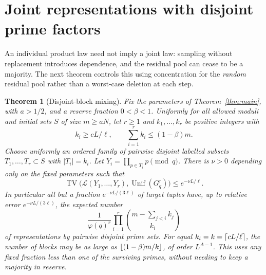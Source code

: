 \documentclass[11pt]{article}
\newtheorem{theorem}{Theorem}[section]
\theoremstyle{remark}\newtheorem{remark}[theorem]{Remark}
\newcommand{\TV}{\operatorname{TV}}\newcommand{\abs}[1]{\lvert#1\rvert}
\begin{document}
\section{Joint representations with disjoint prime factors}
\label{sec:joint}
An individual product law need not imply a joint law: sampling without replacement introduces dependence, and the residual pool can cease to be a majority. The next theorem controls this using concentration for the \emph{random} residual pool rather than a worst-case deletion at each step.
\begin{theorem}[Disjoint-block mixing]\label{thm:joint}
Fix the parameters of Theorem~\ref{thm:main}, with $a>1/2$, and a reserve fraction $0<\beta<1$. Uniformly for all allowed moduli and initial sets $S$ of size $m\ge aN$, let $r\ge1$ and $k_1,\ldots,k_r$ be positive integers with
\[
 k_i\ge cL/\ell,\qquad \sum_{i=1}^r k_i\le (1-\beta)m.
\]
Choose uniformly an ordered family of pairwise disjoint labelled subsets $T_1,\ldots,T_r\subset S$ with $|T_i|=k_i$. Let $Y_i=\prod_{p\in T_i}p\pmod q$. There is $\nu>0$ depending only on the fixed parameters such that
\begin{equation}\label{eq:joint}
 \TV\bigl(\mathcal L(Y_1,\ldots,Y_r),\operatorname{Unif}(G_q^r)\bigr)
 \le e^{-\nu L/\ell}.
\end{equation}
In particular all but a fraction $e^{-\nu L/(3\ell)}$ of target tuples have, up to relative error $e^{-\nu L/(3\ell)}$, the expected number
\begin{equation}\label{eq:jointcount}
 \frac{1}{\varphi(q)^r}\prod_{i=1}^r\binom{m-\sum_{j<i}k_j}{k_i}
\end{equation}
of representations by pairwise disjoint prime sets. For equal $k_i=k=\lceil cL/\ell\rceil$, the number of blocks may be as large as $\lfloor(1-\beta)m/k\rfloor$, of order $L^{A-1}$. This uses any fixed fraction less than one of the surviving primes, without needing to keep a majority in reserve.
\end{theorem}
\end{document}
